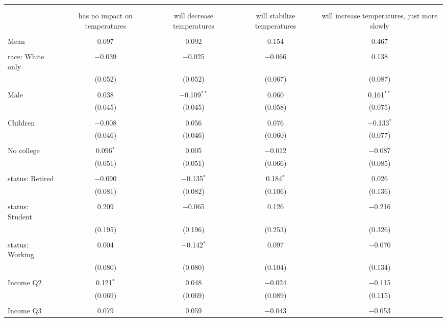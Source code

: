 
\begin{tabular}{@{\extracolsep{5pt}}lcccc} 
\\[-1.8ex]\hline 
\hline \\[-1.8ex] 
\\[-1.8ex] & has no impact on temperatures & will decrease temperatures & will stabilize temperatures & will increase temperatures, just more slowly \\ 
\hline \\[-1.8ex] 
 Mean & 0.097 & 0.092 & 0.154 & 0.467  \\ \hline \\[-1.8ex] race: White only & $-$0.039 & $-$0.025 & $-$0.066 & 0.138 \\ 
  & (0.052) & (0.052) & (0.067) & (0.087) \\ 
  & & & & \\ 
 Male & 0.038 & $-$0.109$^{**}$ & 0.060 & 0.161$^{**}$ \\ 
  & (0.045) & (0.045) & (0.058) & (0.075) \\ 
  & & & & \\ 
 Children & $-$0.008 & 0.056 & 0.076 & $-$0.133$^{*}$ \\ 
  & (0.046) & (0.046) & (0.060) & (0.077) \\ 
  & & & & \\ 
 No college & 0.096$^{*}$ & 0.005 & $-$0.012 & $-$0.087 \\ 
  & (0.051) & (0.051) & (0.066) & (0.085) \\ 
  & & & & \\ 
 status: Retired & $-$0.090 & $-$0.135$^{*}$ & 0.184$^{*}$ & 0.026 \\ 
  & (0.081) & (0.082) & (0.106) & (0.136) \\ 
  & & & & \\ 
 status: Student & 0.209 & $-$0.065 & 0.126 & $-$0.216 \\ 
  & (0.195) & (0.196) & (0.253) & (0.326) \\ 
  & & & & \\ 
 status: Working & 0.004 & $-$0.142$^{*}$ & 0.097 & $-$0.070 \\ 
  & (0.080) & (0.080) & (0.104) & (0.134) \\ 
  & & & & \\ 
 Income Q2 & 0.121$^{*}$ & 0.048 & $-$0.024 & $-$0.115 \\ 
  & (0.069) & (0.069) & (0.089) & (0.115) \\ 
  & & & & \\ 
 Income Q3 & 0.079 & 0.059 & $-$0.043 & $-$0.053 \\ 

\end{tabular}
